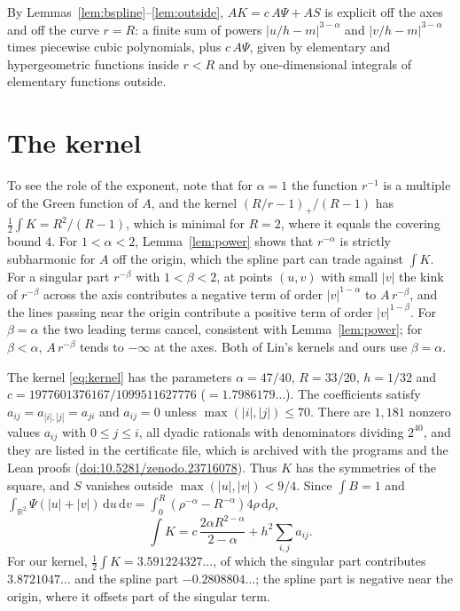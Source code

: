 \documentclass[11pt]{amsart}
\theoremstyle{definition}
\theoremstyle{remark}
\numberwithin{equation}{section}
\newcommand{\R}{\mathbb{R}}
\newcommand{\dd}{\,\mathrm{d}}
\newcommand{\MASSHALF}{3.591224327\ldots}
\newcommand{\ALPHA}{47/40}
\newcommand{\RR}{33/20}
\newcommand{\HH}{1/32}
\newcommand{\CC}{1977601376167/1099511627776}
\newcommand{\CCdec}{1.7986179\ldots}
\newcommand{\NCLASS}{1{,}181}
\newcommand{\MAXIDX}{70}
\newcommand{\SUPPU}{9/4}
\newcommand{\DENMAX}{2^{40}}
\newcommand{\SINGHALF}{3.8721047\ldots}
\newcommand{\SPLHALF}{-0.2808804\ldots}
\newcommand{\ZENODODOI}{10.5281/zenodo.23716078}
\begin{document}
By Lemmas~\ref{lem:bspline}--\ref{lem:outside}, $AK=c\,A\Psi+AS$ is explicit off the axes and off the curve $r=R$: a finite sum of powers $|u/h-m|^{3-\alpha}$ and $|v/h-m|^{3-\alpha}$ times piecewise cubic polynomials, plus $c\,A\Psi$, given by elementary and hypergeometric functions inside $r<R$ and by one-dimensional integrals of elementary functions outside.

\section{The kernel}\label{sec:kernel}

To see the role of the exponent, note that for $\alpha=1$ the function $r^{-1}$ is a multiple of the Green function of $A$, and the kernel $(R/r-1)_+/(R-1)$ has $\frac12\int K=R^2/(R-1)$, which is minimal for $R=2$, where it equals the covering bound $4$. For $1<\alpha<2$, Lemma~\ref{lem:power} shows that $r^{-\alpha}$ is strictly subharmonic for $A$ off the origin, which the spline part can trade against $\int K$. For a singular part $r^{-\beta}$ with $1<\beta<2$, at points $(u,v)$ with small $|v|$ the kink of $r^{-\beta}$ across the axis contributes a negative term of order $|v|^{1-\alpha}$ to $A\,r^{-\beta}$, and the lines passing near the origin contribute a positive term of order $|v|^{1-\beta}$. For $\beta=\alpha$ the two leading terms cancel, consistent with Lemma~\ref{lem:power}; for $\beta<\alpha$, $A\,r^{-\beta}$ tends to $-\infty$ at the axes. Both of Lin's kernels and ours use $\beta=\alpha$.

The kernel \eqref{eq:kernel} has the parameters $\alpha=\ALPHA$, $R=\RR$, $h=\HH$ and $c=\CC$ ($=\CCdec$). The coefficients satisfy $a_{ij}=a_{|i|,|j|}=a_{ji}$ and $a_{ij}=0$ unless $\max(|i|,|j|)\le\MAXIDX$. There are $\NCLASS$ nonzero values $a_{ij}$ with $0\le j\le i$, all dyadic rationals with denominators dividing $\DENMAX$, and they are listed in the certificate file, which is archived with the programs and the Lean proofs (\href{https://doi.org/\ZENODODOI}{doi:\ZENODODOI}). Thus $K$ has the symmetries of the square, and $S$ vanishes outside $\max(|u|,|v|)<\SUPPU$. Since $\int B=1$ and $\int_{\R^2}\Psi(|u|+|v|)\dd u\dd v=\int_0^R(\rho^{-\alpha}-R^{-\alpha})4\rho\dd\rho$,
\begin{equation}\label{eq:mass}
\int K=c\,\frac{2\alpha R^{2-\alpha}}{2-\alpha}+h^2\sum_{i,j}a_{ij}.
\end{equation}
For our kernel, $\frac12\int K=\MASSHALF$, of which the singular part contributes $\SINGHALF$ and the spline part $\SPLHALF$; the spline part is negative near the origin, where it offsets part of the singular term.
\end{document}
